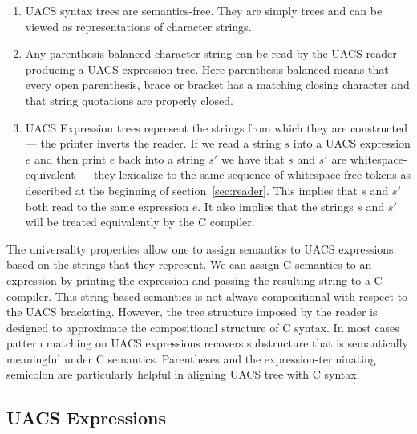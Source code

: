 \documentclass{article}
\begin{document}
\begin{enumerate}
\item UACS syntax trees are semantics-free.  They are simply trees and can be viewed as representations of character strings.

\item Any parenthesis-balanced character string can be read by the UACS reader producing a UACS expression tree.
  Here parenthesis-balanced means that every open parenthesis, brace or bracket has a matching closing character and that string quotations
  are properly closed.
  
\item UACS Expression trees represent the strings from which they are constructed --- the printer inverts the reader. If we read a string $s$ into a UACS expression
  $e$ and then print $e$ back into a string $s'$ we have that $s$ and $s'$ are whitespace-equivalent
 --- they lexicalize to the same sequence of whitespace-free tokens as
  described at the beginning of section~\ref{sec:reader}.    This implies that $s$ and $s'$ both read to the same expression $e$.  It also implies that the strings $s$ and $s'$ will be treated equivalently by the C compiler.
\end{enumerate}

The universality properties allow one to assign semantics to UACS expressions based on the strings that they represent.  We can assign C
semantics to an expression by printing the expression and passing the resulting string to a C compiler.  This string-based semantics is not always
compositional with respect to the UACS bracketing.  However, the tree structure imposed by the reader is designed to approximate the
compositional structure of C syntax.  In most cases pattern matching on UACS expressions recovers substructure that is semantically meaningful under C
semantics. Parentheses and the expression-terminating semicolon are particularly helpful in aligning UACS tree with C syntax.

\subsection{UACS Expressions}
\end{document}
